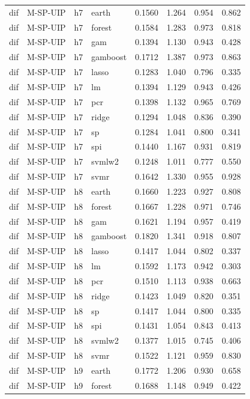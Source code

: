 \begin{ThreePartTable}
\begin{longtable}[t]{llclcccc}
dif & M-SP-UIP & h7 & earth & 0.1560 & 1.264 & 0.954 & 0.862\\
dif & M-SP-UIP & h7 & forest & 0.1584 & 1.283 & 0.973 & 0.818\\
dif & M-SP-UIP & h7 & gam & 0.1394 & 1.130 & 0.943 & 0.428\\
dif & M-SP-UIP & h7 & gamboost & 0.1712 & 1.387 & 0.973 & 0.863\\
dif & M-SP-UIP & h7 & lasso & 0.1283 & 1.040 & 0.796 & 0.335\\
dif & M-SP-UIP & h7 & lm & 0.1394 & 1.129 & 0.943 & 0.426\\
dif & M-SP-UIP & h7 & pcr & 0.1398 & 1.132 & 0.965 & 0.769\\
dif & M-SP-UIP & h7 & ridge & 0.1294 & 1.048 & 0.836 & 0.390\\
dif & M-SP-UIP & h7 & sp & 0.1284 & 1.041 & 0.800 & 0.341\\
dif & M-SP-UIP & h7 & spi & 0.1440 & 1.167 & 0.931 & 0.819\\
dif & M-SP-UIP & h7 & svmlw2 & 0.1248 & 1.011 & 0.777 & 0.550\\
dif & M-SP-UIP & h7 & svmr & 0.1642 & 1.330 & 0.955 & 0.928\\
\addlinespace
dif & M-SP-UIP & h8 & earth & 0.1660 & 1.223 & 0.927 & 0.808\\
dif & M-SP-UIP & h8 & forest & 0.1667 & 1.228 & 0.971 & 0.746\\
dif & M-SP-UIP & h8 & gam & 0.1621 & 1.194 & 0.957 & 0.419\\
dif & M-SP-UIP & h8 & gamboost & 0.1820 & 1.341 & 0.918 & 0.807\\
dif & M-SP-UIP & h8 & lasso & 0.1417 & 1.044 & 0.802 & 0.337\\
dif & M-SP-UIP & h8 & lm & 0.1592 & 1.173 & 0.942 & 0.303\\
dif & M-SP-UIP & h8 & pcr & 0.1510 & 1.113 & 0.938 & 0.663\\
dif & M-SP-UIP & h8 & ridge & 0.1423 & 1.049 & 0.820 & 0.351\\
dif & M-SP-UIP & h8 & sp & 0.1417 & 1.044 & 0.800 & 0.335\\
dif & M-SP-UIP & h8 & spi & 0.1431 & 1.054 & 0.843 & 0.413\\
dif & M-SP-UIP & h8 & svmlw2 & 0.1377 & 1.015 & 0.745 & 0.406\\
dif & M-SP-UIP & h8 & svmr & 0.1522 & 1.121 & 0.959 & 0.830\\
\addlinespace
dif & M-SP-UIP & h9 & earth & 0.1772 & 1.206 & 0.930 & 0.658\\
dif & M-SP-UIP & h9 & forest & 0.1688 & 1.148 & 0.949 & 0.422\\

\end{longtable}
\end{ThreePartTable}
